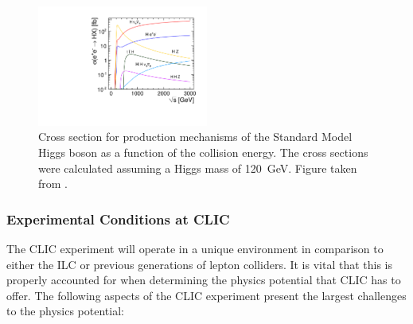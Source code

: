 \begin{figure}[h!]
\includegraphics[width=0.5\textwidth]{Introduction/Plots/CDRPlots/HiggsCrossSectionCLIC.pdf}
\caption[Cross section for production mechanisms of the Standard Model Higgs boson as a function of the collision energy.  The cross sections were calculated assuming a Higgs mass of 120~GeV.  Figure taken from \cite{Linssen:2012hp}.]{Cross section for production mechanisms of the Standard Model Higgs boson as a function of the collision energy.  The cross sections were calculated assuming a Higgs mass of 120~GeV.  Figure taken from \cite{Linssen:2012hp}.}
\label{fig:higssprodclic}
\end{figure}


\subsubsection{Experimental Conditions at CLIC}
The CLIC experiment will operate in a unique environment in comparison to either the ILC or previous generations of lepton colliders.  It is vital that this is properly accounted for when determining the physics potential that CLIC has to offer.  The following aspects of the CLIC experiment present the largest challenges to the physics potential:

